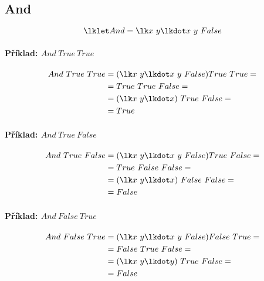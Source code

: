 \subsection{And}

$$ \lklet And = \lk x ~ y \lkdot x ~ y ~ False $$

\paragraph*{Příklad: $And ~ True ~ True$}
\begin{equation}
    \begin{split}
        And ~ True ~ True &= (\lk x ~ y \lkdot x ~ y ~ False) True ~ True = \\
        &= True ~ True ~ False = \\
        &= (\lk x ~ y \lkdot x) ~ True ~ False = \\
        &= True
    \end{split}
\end{equation}

\paragraph*{Příklad: $And ~ True ~ False$}
\begin{equation}
    \begin{split}
        And ~ True ~ False &= (\lk x ~ y \lkdot x ~ y ~ False) True ~ False = \\
        &= True ~ False ~ False = \\
        &= (\lk x ~ y \lkdot x) ~ False ~ False = \\
        &= False
    \end{split}
\end{equation}

\paragraph*{Příklad: $And ~ False ~ True$}
\begin{equation}
    \begin{split}
        And ~ False ~ True &= (\lk x ~ y \lkdot x ~ y ~ False) False ~ True = \\
        &= False ~ True ~ False = \\
        &= (\lk x ~ y \lkdot y) ~ True ~ False = \\
        &= False
    \end{split}
\end{equation}

